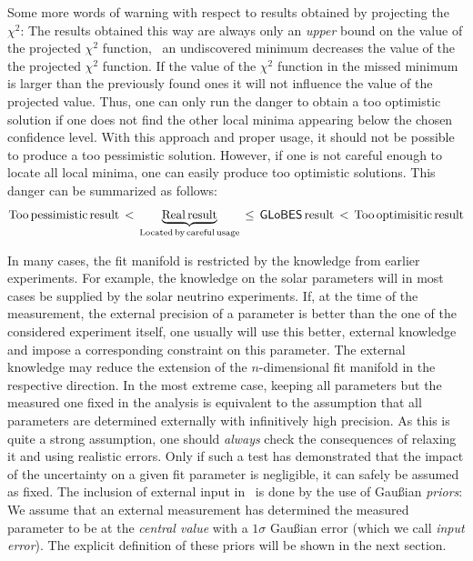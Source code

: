 Some more words of warning with respect to results obtained by projecting
the $\chi^2$:
The results obtained this way are always only an \emph{upper} bound on the
value of the projected $\chi^2$ function, \ie\ an undiscovered minimum 
decreases the value of the the projected $\chi^2$ function. If the value
of the $\chi^2$ function in the missed minimum is larger than the
previously found ones it will not influence the value of the projected 
value. 
Thus, one can only run the danger to obtain a too optimistic solution 
if one does not find the other local minima appearing 
below the chosen confidence level. With this approach and proper usage,
 it should not be possible to produce a too pessimistic solution. 
However, if one is not careful enough to locate
all local minima, one can easily produce too optimistic solutions.
This danger can be summarized as follows:
\begin{equation}
\mathrm{Too \, pessimistic \, result} \, < \, \underbrace{\mathrm{Real \, result}}_{\mathrm{Located \, by \, careful \, usage}} \, \le \, \mathrm{{\sf GLoBES} \, result} \,  < \,  \mathrm{Too \, optimisitic \, result} \nonumber
\end{equation}

In many cases, the fit manifold is restricted by the knowledge 
from earlier experiments. For example, the knowledge on the solar 
parameters will in most cases be supplied by the solar neutrino experiments. 
If, at the time of the measurement, the external precision of a parameter is
better than the one of the considered experiment itself, one usually will use
this better, external knowledge and impose a corresponding constraint
 on this parameter. The external knowledge may reduce the extension of the 
$n$-dimensional fit manifold in the respective direction. In the most 
extreme case, keeping all parameters but the measured one fixed 
in the analysis is equivalent to the assumption that all parameters 
are determined externally with infinitively high precision. As this 
is quite a strong assumption, one should \emph{always} check the 
consequences of relaxing it and using realistic errors. Only if such
a test has demonstrated that the impact of the uncertainty on a 
given fit parameter is negligible, it can safely be assumed as fixed. 
 The inclusion of external input in \GLOBES\ is done by the use of 
Gau\ss ian {\em priors}: We assume that an external measurement has 
determined the measured parameter to be at the \emph{central value}
with a $1 \sigma$ Gau\ss ian error (which we call {\em input error}).
The explicit definition of these priors will be shown in the next section. 

